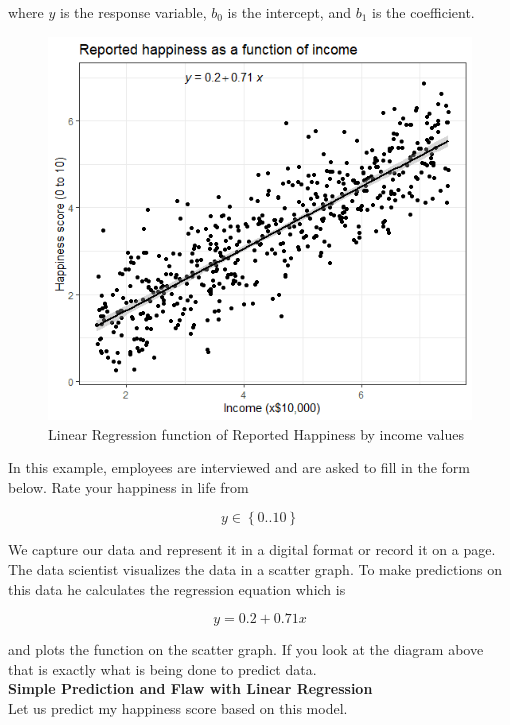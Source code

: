 where $y$ is the response variable, $b_0$ is the intercept, and $b_1$ is the coefficient. \\

\begin{figure}[H]
    \includegraphics[width=\linewidth]{images/linearregeg.png}
    \caption{Linear Regression function of Reported Happiness by income values}
    \label{fig:linearregressionfunction}
\end{figure}

In this example, employees are interviewed and are asked to fill in the form below.
Rate your happiness in life from 

\begin{equation}
y \in \left\{0..10\right\} 
\end{equation}
 
We capture our data and represent it in a digital format or record it on a page.
The data scientist visualizes the data in a scatter graph. To make predictions on this data he calculates the regression equation which is 

\begin{equation}
y=0.2+0.71x 
\end{equation}

and plots the function on the scatter graph. If you look at the diagram above that is exactly what is being done to predict data. \\

\textbf{Simple Prediction and Flaw with Linear Regression} \\ 
Let us predict my happiness score based on this model. \\ 

